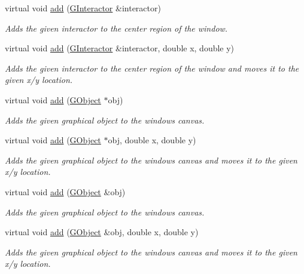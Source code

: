 \begin{DoxyCompactItemize}
virtual void \mbox{\hyperlink{classsgl_1_1GWindow_a33b08fe5428ed634a658deab076099f7}{add}} (\mbox{\hyperlink{classsgl_1_1GInteractor}{G\+Interactor}} \&interactor)
\begin{DoxyCompactList}\small\item\em Adds the given interactor to the center region of the window. \end{DoxyCompactList}\item 
virtual void \mbox{\hyperlink{classsgl_1_1GWindow_a56840f453f9938083c24c7fb1a4c377e}{add}} (\mbox{\hyperlink{classsgl_1_1GInteractor}{G\+Interactor}} \&interactor, double x, double y)
\begin{DoxyCompactList}\small\item\em Adds the given interactor to the center region of the window and moves it to the given x/y location. \end{DoxyCompactList}\item 
virtual void \mbox{\hyperlink{classsgl_1_1GWindow_a2327d64402837eedd533c098014e46d9}{add}} (\mbox{\hyperlink{classsgl_1_1GObject}{G\+Object}} $\ast$obj)
\begin{DoxyCompactList}\small\item\em Adds the given graphical object to the window\textquotesingle{}s canvas. \end{DoxyCompactList}\item 
virtual void \mbox{\hyperlink{classsgl_1_1GWindow_ab5388ece7a50b46e0ee72e11fe202609}{add}} (\mbox{\hyperlink{classsgl_1_1GObject}{G\+Object}} $\ast$obj, double x, double y)
\begin{DoxyCompactList}\small\item\em Adds the given graphical object to the window\textquotesingle{}s canvas and moves it to the given x/y location. \end{DoxyCompactList}\item 
virtual void \mbox{\hyperlink{classsgl_1_1GWindow_a7f596867e2d8f9dfb816b3d496ea074f}{add}} (\mbox{\hyperlink{classsgl_1_1GObject}{G\+Object}} \&obj)
\begin{DoxyCompactList}\small\item\em Adds the given graphical object to the window\textquotesingle{}s canvas. \end{DoxyCompactList}\item 
virtual void \mbox{\hyperlink{classsgl_1_1GWindow_ac302bb932e3905e5d368ce735ad8444c}{add}} (\mbox{\hyperlink{classsgl_1_1GObject}{G\+Object}} \&obj, double x, double y)
\begin{DoxyCompactList}\small\item\em Adds the given graphical object to the window\textquotesingle{}s canvas and moves it to the given x/y location. \end{DoxyCompactList}\item 

\end{DoxyCompactItemize}
